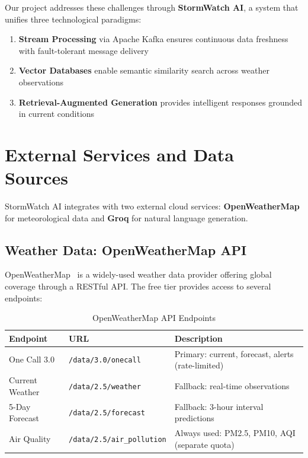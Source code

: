 \documentclass[11pt,a4paper]{article}
\begin{document}
Our project addresses these challenges through \textbf{StormWatch AI}, a system that unifies three technological paradigms:

\begin{enumerate}[leftmargin=2em, itemsep=0.3em]
    \item \textbf{Stream Processing} via Apache Kafka ensures continuous data freshness with fault-tolerant message delivery
    \item \textbf{Vector Databases} enable semantic similarity search across weather observations
    \item \textbf{Retrieval-Augmented Generation} provides intelligent responses grounded in current conditions
\end{enumerate}


\newpage
\section{External Services and Data Sources}

StormWatch AI integrates with two external cloud services: \textbf{OpenWeatherMap} for meteorological data and \textbf{Groq} for natural language generation.

\subsection{Weather Data: OpenWeatherMap API}

OpenWeatherMap~\cite{openweather} is a widely-used weather data provider offering global coverage through a RESTful API. The free tier provides access to several endpoints:

\begin{table}[H]
\centering
\caption{OpenWeatherMap API Endpoints}
\renewcommand{\arraystretch}{1.3}
\begin{tabular}{l l p{6cm}}
\toprule
\textbf{Endpoint} & \textbf{URL} & \textbf{Description} \\
\midrule
One Call 3.0 & \texttt{/data/3.0/onecall} & Primary: current, forecast, alerts (rate-limited) \\
Current Weather & \texttt{/data/2.5/weather} & Fallback: real-time observations \\
5-Day Forecast & \texttt{/data/2.5/forecast} & Fallback: 3-hour interval predictions \\
Air Quality & \texttt{/data/2.5/air\_pollution} & Always used: PM2.5, PM10, AQI (separate quota) \\
\bottomrule
\end{tabular}
\end{table}
\end{document}
